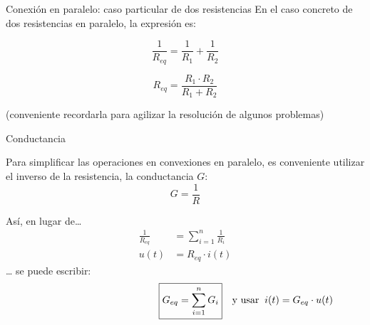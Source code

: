 \documentclass[aspectratio=169, xcolor={usenames,svgnames,dvipsnames}]{beamer}
\begin{document}

\begin{frame}{Conexión en paralelo: \hspace{3mm} caso particular de dos resistencias}
    En el caso concreto de \alert{dos} resistencias en paralelo, la expresión es:
    
    \begin{equation*}
      \frac{1}{R_{eq}} = \frac{1}{R_1} + \frac{1}{R_2}
    \end{equation*}
    
    \begin{equation*}
      \boxed{R_{eq} = \frac{R_1 \cdot R_2}{R_1 + R_2}}
    \end{equation*}
    
    \centering \small{(conveniente recordarla para agilizar la resolución de algunos problemas)}
\end{frame}


\begin{frame}{Conductancia}

    \vspace{4mm}
    Para \alert{simplificar las operaciones} en convexiones en paralelo, es conveniente utilizar el inverso de la resistencia, la \alert{conductancia} $G$:
    \begin{equation*}
      G = \frac{1}{R}
    \end{equation*}
    
    Así, en lugar de\ldots{}
    \vspace{-2mm}
    \begin{align*}
      \frac{1}{R_{eq}} &= \sum_{i = 1}^n \frac{1}{R_i}\\[4pt]
      u(t) &= R_{eq} \cdot i(t)
    \end{align*}
    \ldots{} se puede escribir:
    \begin{equation*}
      \hspace{43mm} \boxed{G_{eq} = \sum_{i = 1}^n G_i} \quad \textrm{y usar} \;\; i(t) = G_{eq} \cdot u(t)
    \end{equation*}
\end{frame}

\end{document}
